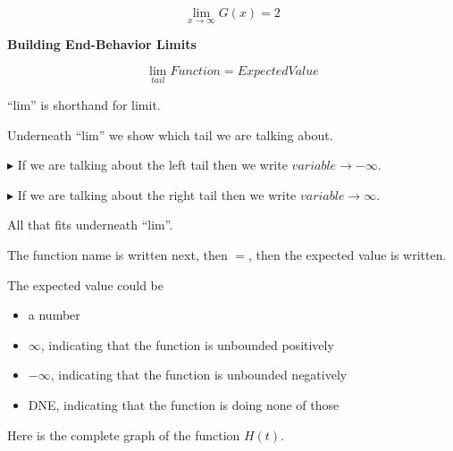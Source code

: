 \documentclass{ximera}
\begin{document}
\[
\lim\limits_{x \to \infty} G(x) = 2
\]



\begin{notation} \textbf{\textcolor{red!50!green}{Building End-Behavior Limits}}  




\[
\lim\limits_{tail} Function = Expected Value
\]



``lim'' is shorthand for limit.  


Underneath ``lim'' we show which tail we are talking about. 


$\blacktriangleright$ If we are talking about the left tail then we write $variable \to -\infty$.

$\blacktriangleright$ If we are talking about the right tail then we write $variable \to \infty$.

All that fits underneath ``lim''.



The function name is written next, then $=$, then the expected value is written.



The expected value could be 

\begin{itemize}
\item a number
\item $\infty$, indicating that the function is unbounded positively
\item $-\infty$, indicating that the function is unbounded negatively
\item DNE, indicating that the function is doing none of those
\end{itemize}


\end{notation}














Here is the complete graph of the function $H(t)$. 
\end{document}
